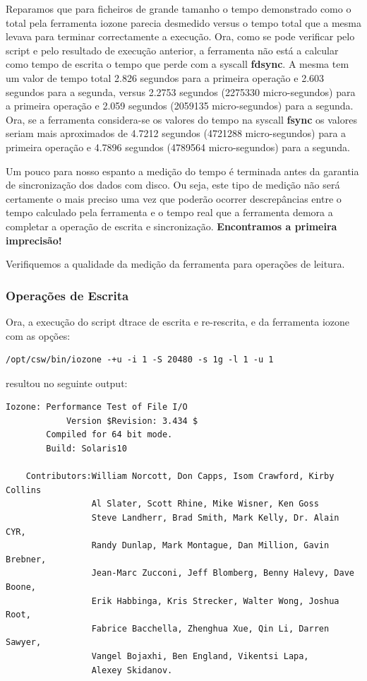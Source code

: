\documentclass[a4paper]{article}
\begin{document}
{Reparamos que para ficheiros de grande tamanho o tempo demonstrado como o total pela ferramenta iozone parecia desmedido versus o tempo total que a mesma levava para terminar correctamente a execução. Ora, como se pode verificar pelo script e pelo resultado de execução anterior, a ferramenta não está a calcular como tempo de escrita o tempo que perde com a syscall \textbf{fdsync}. A mesma tem um valor de tempo total 2.826 segundos para a primeira operação e 2.603 segundos para a segunda, versus 2.2753 segundos (2275330 micro-segundos) para a primeira operação e 2.059 segundos (2059135 micro-segundos) para a segunda. Ora, se a ferramenta considera-se os valores do tempo na syscall \textbf{fsync} os valores seriam mais aproximados de 4.7212 segundos (4721288 micro-segundos) para a primeira operação e 4.7896 segundos (4789564 micro-segundos) para a segunda. \par 
Um pouco para nosso espanto a medição do tempo é terminada antes da garantia de sincronização dos dados com disco. Ou seja, este tipo de medição não será certamente o mais preciso uma vez que poderão ocorrer descrepâncias entre o tempo calculado pela ferramenta e o tempo real que a ferramenta demora a completar a operação de escrita e sincronização. \textbf{Encontramos a primeira imprecisão!}\par 
\label{imprecisao}
Verifiquemos a qualidade da medição da ferramenta para operações de leitura.

\subsubsection{Operações de Escrita}


Ora, a execução do script dtrace de escrita e re-rescrita, e da ferramenta iozone com as opções:

\begin{lstlisting}[style=command]
/opt/csw/bin/iozone -+u -i 1 -S 20480 -s 1g -l 1 -u 1
\end{lstlisting}

 resultou no seguinte output:

\begin{lstlisting}[style=output]
	Iozone: Performance Test of File I/O
	        Version $Revision: 3.434 $
		Compiled for 64 bit mode.
		Build: Solaris10 

	Contributors:William Norcott, Don Capps, Isom Crawford, Kirby Collins
	             Al Slater, Scott Rhine, Mike Wisner, Ken Goss
	             Steve Landherr, Brad Smith, Mark Kelly, Dr. Alain CYR,
	             Randy Dunlap, Mark Montague, Dan Million, Gavin Brebner,
	             Jean-Marc Zucconi, Jeff Blomberg, Benny Halevy, Dave Boone,
	             Erik Habbinga, Kris Strecker, Walter Wong, Joshua Root,
	             Fabrice Bacchella, Zhenghua Xue, Qin Li, Darren Sawyer,
	             Vangel Bojaxhi, Ben England, Vikentsi Lapa,
	             Alexey Skidanov.


\end{lstlisting}}
\end{document}
